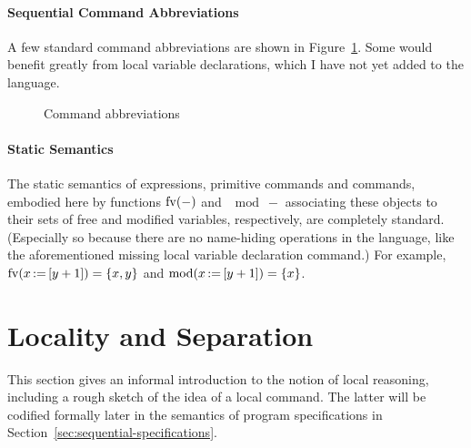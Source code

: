 \documentclass[11pt]{report}
\begin{document}
\paragraph{Sequential Command Abbreviations} A few standard command abbreviations are shown in Figure~\ref{fig:sequential-command-abbreviations}. Some would benefit greatly from local variable declarations, which I have not yet added to the language. 

\begin{figure}[ht]
    \centering
    \caption{\label{fig:sequential-command-abbreviations} Command abbreviations}
\end{figure}

\paragraph{Static Semantics} The static semantics of expressions, primitive commands and commands, embodied here by functions $\mathrm{fv}(-)$ and $\mod{-}$ associating these objects to their sets of free and modified variables, respectively, are completely standard. (Especially so because there are no name-hiding operations in the language, like the aforementioned missing local variable declaration command.) For example, $\mathrm{fv}(x \operatorname{:\!=} \left[ y+1 \right]) = \left\lbrace x,y \right\rbrace$ and $\mathrm{mod}(x \operatorname{:\!=} \left[ y+1 \right]) = \left\lbrace x \right\rbrace$.  

\section{Locality and Separation}
\label{sec:locality}

This section gives an informal introduction to the notion of local reasoning, including a rough sketch of the idea of a local command. The latter will be codified formally later in the semantics of program specifications in Section~\ref{sec:sequential-specifications}. 
\end{document}
